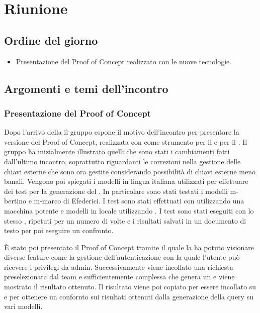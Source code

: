 \section{Riunione}
\subsection{Ordine del giorno}
\begin{itemize}
	\item Presentazione del Proof of Concept realizzato con le nuove tecnologie.
\end{itemize}

\subsection{Argomenti e temi dell'incontro}

\subsubsection{Presentazione del Proof of Concept}

\par Dopo l'arrivo della  il gruppo espone il motivo dell'incontro per presentare la versione del Proof of Concept, realizzata con  come strumento per il  e  per il .
Il gruppo ha inizialmente illustrato quelli che sono stati i cambiamenti fatti dall'ultimo incontro, soprattutto riguardanti le correzioni nella gestione delle chiavi esterne che sono ora gestite considerando possibilità di chiavi esterne meno banali.
Vengono poi spiegati i modelli in lingua italiana utilizzati per effettuare dei test per la generazione del . In particolare sono stati testati i modelli m-bertino e m-marco di Efederici. I test sono stati effettuati con  utilizzando una macchina potente e modelli in locale utilizzando . 
I test sono stati eseguiti con lo stesso , ripetuti per un numero di volte e i risultati salvati in un documento di testo per poi eseguire un confronto.


\par È stato poi presentato il Proof of Concept tramite il quale la  ha potuto visionare diverse feature come la gestione dell'autenticazione con la quale l'utente può ricevere i privilegi da admin. 
Successivamente viene incollato una richiesta preselezionata dal team e sufficientemente complessa che genera un  e viene mostrato il risultato ottenuto.
Il risultato viene poi copiato per essere incollato su  e  per ottenere un confornto sui risultati ottenuti dalla generazione della query su vari modelli.

